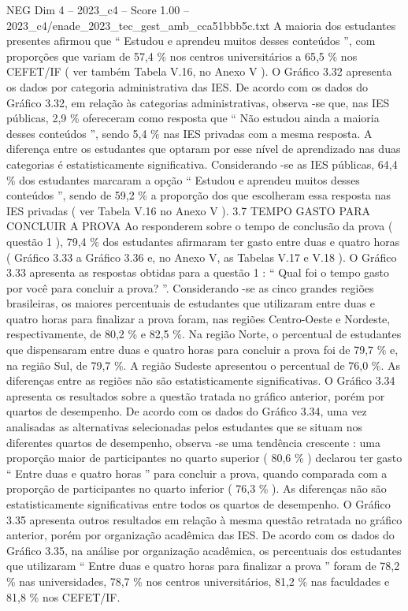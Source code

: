\begin{textsample}{NEG Dim 4 – 2023\_c4 – Score 1.00 – 2023\_c4/enade\_2023\_tec\_gest\_amb\_cca51bbb5c.txt}
A maioria dos estudantes presentes afirmou que “ Estudou e aprendeu muitos desses conteúdos ”, com proporções que variam de 57,4 \% nos centros universitários a 65,5 \% nos CEFET/IF ( ver também Tabela V.16, no Anexo V ).
O Gráfico 3.32 apresenta os dados por categoria administrativa das IES.
De acordo com os dados do Gráfico 3.32, em relação às categorias administrativas, observa -se que, nas IES públicas, 2,9 \% ofereceram como resposta que “ Não estudou ainda a maioria desses conteúdos ”, sendo 5,4 \% nas IES privadas com a mesma resposta.
A diferença entre os estudantes que optaram por esse nível de aprendizado nas duas categorias é estatisticamente significativa.
Considerando -se as IES públicas, 64,4 \% dos estudantes marcaram a opção “ Estudou e aprendeu muitos desses conteúdos ”, sendo de 59,2 \% a proporção dos que escolheram essa resposta nas IES privadas ( ver Tabela V.16 no Anexo V ). 3.7 TEMPO GASTO PARA CONCLUIR A PROVA Ao responderem sobre o tempo de conclusão da prova ( questão 1 ), 79,4 \% dos estudantes afirmaram ter gasto entre duas e quatro horas ( Gráfico 3.33 a Gráfico 3.36 e, no Anexo V, as Tabelas V.17 e V.18 ).
O Gráfico 3.33 apresenta as respostas obtidas para a questão 1 : “ Qual foi o tempo gasto por você para concluir a prova? ”.
Considerando -se as cinco grandes regiões brasileiras, os maiores percentuais de estudantes que utilizaram entre duas e quatro horas para finalizar a prova foram, nas regiões Centro-Oeste e Nordeste, respectivamente, de 80,2 \% e 82,5 \%.
Na região Norte, o percentual de estudantes que dispensaram entre duas e quatro horas para concluir a prova foi de 79,7 \% e, na região Sul, de 79,7 \%.
A região Sudeste apresentou o percentual de 76,0 \%.
As diferenças entre as regiões não são estatisticamente significativas.
O Gráfico 3.34 apresenta os resultados sobre a questão tratada no gráfico anterior, porém por quartos de desempenho.
De acordo com os dados do Gráfico 3.34, uma vez analisadas as alternativas selecionadas pelos estudantes que se situam nos diferentes quartos de desempenho, observa -se uma tendência crescente : uma proporção maior de participantes no quarto superior ( 80,6 \% ) declarou ter gasto “ Entre duas e quatro horas ” para concluir a prova, quando comparada com a proporção de participantes no quarto inferior ( 76,3 \% ).
As diferenças não são estatisticamente significativas entre todos os quartos de desempenho.
O Gráfico 3.35 apresenta outros resultados em relação à mesma questão retratada no gráfico anterior, porém por organização acadêmica das IES.
De acordo com os dados do Gráfico 3.35, na análise por organização acadêmica, os percentuais dos estudantes que utilizaram “ Entre duas e quatro horas para finalizar a prova ” foram de 78,2 \% nas universidades, 78,7 \% nos centros universitários, 81,2 \% nas faculdades e 81,8 \% nos CEFET/IF.

\end{textsample}
